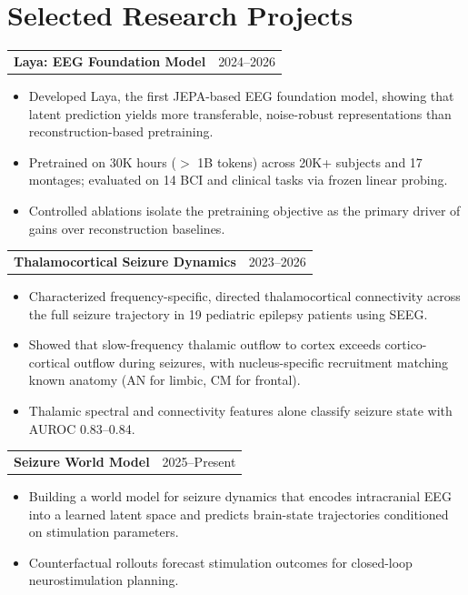 \newenvironment{projectlong}[2]{%
  \begin{tabularx}{\linewidth}{@{}X r@{}}
    \textbf{#1} & #2 \\[3pt]
  \end{tabularx}
  \begin{minipage}[t]{\linewidth} %
  \begin{itemize}[leftmargin=1em, label=--, topsep=2pt, itemsep=3pt]
}{%
  \end{itemize}
  \end{minipage}
  \vspace{0.6em} %
}




\section*{Selected Research Projects}

\begin{projectlong}{Laya: EEG Foundation Model}{2024--2026}
    \item Developed Laya, the first JEPA-based EEG foundation model, showing that latent prediction yields more transferable, noise-robust representations than reconstruction-based pretraining.
    \item Pretrained on 30K hours ($>$ 1B tokens) across 20K+ subjects and 17 montages; evaluated on 14 BCI and clinical tasks via frozen linear probing.
    \item Controlled ablations isolate the pretraining objective as the primary driver of gains over reconstruction baselines.
\end{projectlong}

\begin{projectlong}{Thalamocortical Seizure Dynamics}{2023--2026}
    \item Characterized frequency-specific, directed thalamocortical connectivity across the full seizure trajectory in 19 pediatric epilepsy patients using SEEG.
    \item Showed that slow-frequency thalamic outflow to cortex exceeds cortico-cortical outflow during seizures, with nucleus-specific recruitment matching known anatomy (AN for limbic, CM for frontal).
    \item Thalamic spectral and connectivity features alone classify seizure state with AUROC 0.83--0.84.
\end{projectlong}

\begin{projectlong}{Seizure World Model}{2025--Present}
    \item Building a world model for seizure dynamics that encodes intracranial EEG into a learned latent space and predicts brain-state trajectories conditioned on stimulation parameters.
    \item Counterfactual rollouts forecast stimulation outcomes for closed-loop neurostimulation planning.
\end{projectlong}

